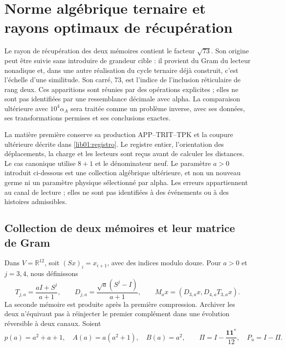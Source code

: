 \section{Norme algébrique ternaire et rayons optimaux de récupération}
\label{lib02:norma-ternaria}

Le rayon de récupération des deux mémoires contient le facteur
\(\sqrt{73}\). Son origine peut être suivie sans introduire de grandeur
cible : il provient du Gram du lecteur nonadique et, dans une autre réalisation du
cycle ternaire déjà construit, c’est l’échelle d’une similitude. Son carré,
\(73\), est l’indice de l’inclusion réticulaire de rang deux. Ces
apparitions sont réunies par des opérations explicites ;
elles ne sont pas identifiées par une ressemblance décimale avec alpha. La comparaison
ultérieure avec \(10^4\alpha_A\) sera traitée comme un problème inverse,
avec ses données, ses transformations permises et ses conclusions exactes.

La matière première conserve sa production APP--TRIT--TPK et la coupure
ultérieure décrite dans \cref{lib01:registro}. Le registre entier,
l’orientation des déplacements, la charge et les lecteurs sont reçus
avant de calculer les distances. Le cas canonique utilise \(8+1\) et le
dénominateur neuf. Le paramètre \(a>0\) introduit ci-dessous
est une collection algébrique ultérieure, et non un nouveau germe ni un paramètre
physique sélectionné par alpha. Les erreurs appartiennent au canal de lecture ;
elles ne sont pas identifiées à des événements ou à des histoires admissibles.

\subsection{Collection de deux mémoires et leur matrice de Gram}
\label{lib02:familia-memoria}

Dans \(V=\mathbb R^{12}\), soit \((Sx)_i=x_{i+1}\), avec des indices modulo
douze. Pour \(a>0\) et \(j=3,4\), nous définissons
\begin{equation}
 T_{j,a}=\frac{aI+S^j}{a+1},\qquad
 D_{j,a}=\frac{\sqrt a(S^j-I)}{a+1},\qquad
 M_ax=(D_{3,a}x,D_{4,a}T_{3,a}x).
 \label{lib02:lectores}
\end{equation}
La seconde mémoire est produite après la première compression. Archiver
les deux n’équivaut pas à réinjecter le premier complément dans une évolution
réversible à deux canaux. Soient
\[
 p(a)=a^2+a+1,\quad A(a)=a(a^2+1),\quad B(a)=a^2,
 \qquad\Pi=I-\frac{\mathbf1\mathbf1^*}{12},\quad P_u=I-\Pi.
\]


